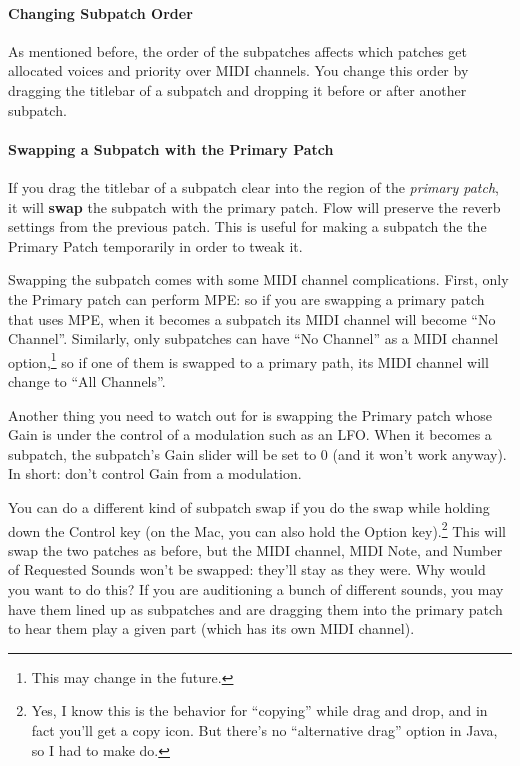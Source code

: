 \documentclass{article}
\begin{document}
\paragraph{Changing Subpatch Order}

As mentioned before, the order of the subpatches affects which patches get allocated voices and priority over MIDI channels.  You change this order by dragging the titlebar of a subpatch and dropping it before or after another subpatch.

\paragraph{Swapping a Subpatch with the Primary Patch}

If you drag the titlebar of a subpatch clear into the region of the {\it primary patch}, it will {\bf swap} the subpatch with the primary patch.  Flow will preserve the reverb settings from the previous patch.  This is useful for making a subpatch the the Primary Patch temporarily in order to tweak it.

Swapping the subpatch comes with some MIDI channel complications.  First, only the Primary patch can perform MPE: so if you are swapping a primary patch that uses MPE, when it becomes a subpatch its MIDI channel will become ``No Channel''.  Similarly, only subpatches can have ``No Channel'' as a MIDI channel option,\footnote{This may change in the future.} so if one of them is swapped to a primary path, its MIDI channel will change to ``All Channels''.

Another thing you need to watch out for is swapping the Primary patch whose Gain is under the control of a modulation such as an LFO.  When it becomes a subpatch, the subpatch's Gain slider will be set to 0 (and it won't work anyway).  In short: don't control Gain from a modulation.

You can do a different kind of subpatch swap if you do the swap while holding down the Control key (on the Mac, you can also hold the Option key).\footnote{Yes, I know this is the behavior for ``copying'' while drag and drop, and in fact you'll get a copy icon.  But there's no ``alternative drag'' option in Java, so I had to make do.}  This will swap the two patches as before, but the MIDI channel, MIDI Note, and Number of Requested Sounds won't be swapped: they'll stay as they were.  Why would you want to do this?  If you are auditioning a bunch of different sounds, you may have them lined up as subpatches and are dragging them into the primary patch to hear them play a given part (which has its own MIDI channel).
\end{document}
